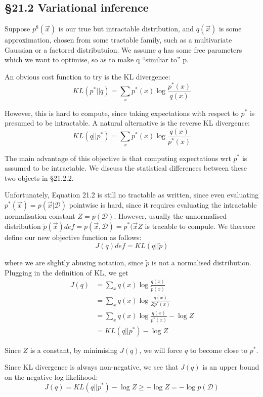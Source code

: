 \documentclass{amsart}
\begin{document}
\subsection{\S 21.2 Variational inference}

Suppose $p^{8}(\vec{x})$ is our true but intractable distribution, and $q(\vec{x})$ is some 
approximation, chosen from some tractable family, such as a multivariate Gaussian or a
factored distributuion. We assume $q$ has some free parameters which we want to optimise,
so as to make q ``similiar to'' p.

An obvious cost function to try is the KL divergence:
\[
	KL(p^{*}||q) = \sum_x p^{*}(x) \log{\frac{p^{*}(x)}{q(x)}}
\]

However, this is hard to compute, since taking expectations with respect to $p^{*}$ is
presumed to be intractable. A natural alternative is the reverse KL divergence:
\[
	KL(q||p^{*}) = \sum_x p^{*}(x) \log{\frac{q(x)}{p^{*}(x)}}
\]

The main advantage of this objective is that computing expectations wrt $p^{*}$ is assumed
to be intractable. We discuss the statistical differences between these two objects in
\S 21.2.2. %

Unfortunately, Equation 21.2 is still no tractable as written, since even evaluating
$p^{*}(\vec{x}) = p(\vec{x} | \mathcal{D})$ pointwise is hard, since it requires evaluating
the intractable normalisation constant $Z=p(\mathcal{D})$. However, usually the unnormalised
distribution $\tilde{p}(\vec{x}) def = p(\vec{x}, \mathcal{D}) = p^{*}(\vec{x} Z$ is
tracable to compule. We thereore define our new objective function as follows:
\[
J(q) def = KL(q||\tilde{p})
\]

where we are slightly abusing notation, since $\tilde{p}$ is not a normalised distribution.
Plugging in the definition of KL, we get
\begin{align*}
J(q) &= \sum_x q(x) \log{\frac{q(x)}{\tilde{p}(x)}} \\
&= \sum_x q(x) \log{\frac{q(x)}{Z p^{*}(x)}} \\
&= \sum_x q(x) \log{\frac{q(x)}{p^{*}(x)}} - \log{Z} \\
&= KL(q || p^{*}) - \log{Z}
\end{align*}

Since $Z$ is a constant, by minimising $J(q)$, we will force $q$ to become close to
$p^{*}$.

Since KL divergence is always non-negative, we see that $J(q)$ is an upper bound on the
negative log likelihood:
\[
J(q) = KL(q||p^{*}) - \log{Z} \geq -\log{Z} = -\log{p(\mathcal{D})}
\]
\end{document}
